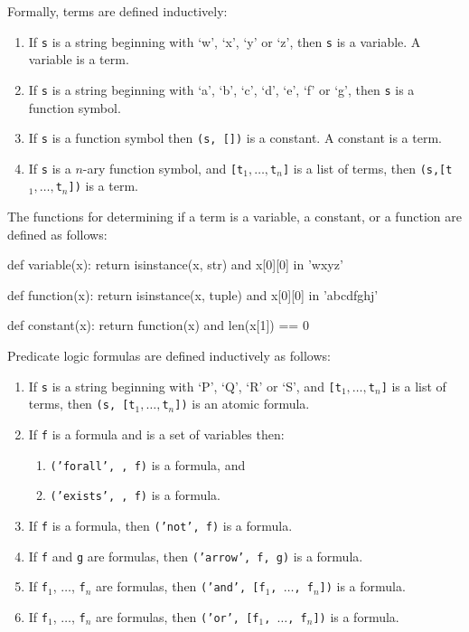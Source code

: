 \documentclass[a4paper,notitlepage]{scrartcl}
\begin{document}
Formally, terms are defined inductively:
\begin{enumerate}
\item If \texttt{s} is a string beginning with `w', `x', `y' or `z', then
   \texttt{s} is a variable.
A variable is a term.
\item If \texttt{s} is a string beginning with `a', `b', `c', `d', `e', `f' or
   `g', then \texttt{s} is a function symbol.
\item If \texttt{s} is a function symbol then \texttt{(s, [])} is a constant.
A constant is a term.
\item  
If \texttt{s} is a $n$-ary function symbol, and \texttt{[t$_1,\ldots,$t$_n$]} 
   is a list of terms, then \texttt{(s,[t$_1,\ldots,$t$_n$])} is a term.
\end{enumerate}

The functions for determining if a term is a variable, a constant, or a
   function are defined as follows:
\begin{code}
def variable(x):
    return isinstance(x, str) and x[0][0] in 'wxyz'

def function(x):
    return isinstance(x, tuple) and x[0][0] in 'abcdfghj'

def constant(x):
    return function(x) and len(x[1]) == 0 
\end{code}

Predicate logic formulas are defined inductively as follows:
\begin{enumerate}
\item If \texttt{s} is a string beginning with `P', `Q', `R' or `S', and 
   \texttt{[t$_1,\ldots,$t$_n$]} is a list of terms, then \texttt{(s, [t$_1,
      \ldots, $t$_n$])} is an atomic formula.
\item If \texttt{f} is a formula and \texttt{} is a set of
   variables then:
   \begin{enumerate}
      \item \texttt{('forall', , f)} is a formula, and
      \item \texttt{('exists', , f)} is a formula.
   \end{enumerate}

\item
If \texttt{f} is a formula, then \texttt{('not', f)} is a formula.

\item
If \texttt{f} and \texttt{g} are formulas, then \texttt{('arrow', f, g)} is a
formula.

\item
If \texttt{f}$_1$, $\ldots$, \texttt{f}$_n$ are formulas, then \texttt{('and',
[f$_1$, $\ldots$, f$_n$])} is a formula.

\item
If \texttt{f}$_1$, $\ldots$, \texttt{f}$_n$ are formulas, then \texttt{('or',
[f$_1$, $\ldots$, f$_n$])} is a formula.
\end{enumerate}
\end{document}
